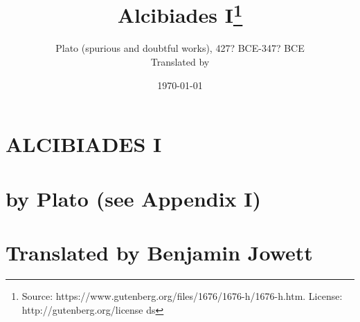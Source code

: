 \documentclass[11pt,letter]{article}
\begin{document}
\title{Alcibiades I\thanks{Source: https://www.gutenberg.org/files/1676/1676-h/1676-h.htm. License: http://gutenberg.org/license ds}}
\date{\today}
\author{Plato (spurious and doubtful works), 427? BCE-347? BCE\\ Translated by }
\maketitle

\setcounter{tocdepth}{1}
\tableofcontents
\renewcommand{\baselinestretch}{1.0}
\normalsize
\newpage


\par 
\section{
      ALCIBIADES I
    }
\par 
\section{
      by Plato (see Appendix I)
    }
\par 
\section{
      Translated by Benjamin Jowett
    }
\par 

\par 
\end{document}
